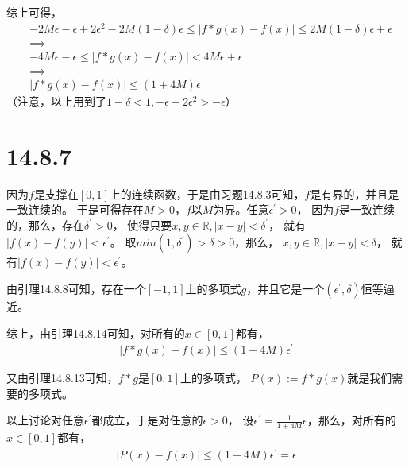 \documentclass{article}
\begin{document}
\begin{itemize}
        综上可得，
        \begin{align*}
           & -2M\epsilon - \epsilon + 2\epsilon^2 -2M(1-\delta)\epsilon \leq |f \ast g(x) - f(x)| \leq 2M(1-\delta)\epsilon + \epsilon \\
           & \implies                                                                                                                  \\
           & -4M\epsilon - \epsilon \leq |f \ast g(x) - f(x)| < 4M\epsilon + \epsilon                                                  \\
           & \implies                                                                                                                  \\
           & |f \ast g(x) - f(x)| \leq (1 + 4M)\epsilon
        \end{align*}
        （注意，以上用到了$1 - \delta < 1, - \epsilon + 2\epsilon^2 > -\epsilon$）

\end{itemize}

\section*{14.8.7}

因为$f$是支撑在$[0,1]$上的连续函数，于是由习题14.8.3可知，$f$是有界的，并且是一致连续的。
于是可得存在$M > 0$，$f$以$M$为界。任意$\epsilon^\prime > 0$，
因为$f$是一致连续的，那么，存在$\delta^\prime > 0$，
使得只要$x, y \in \mathbb{R}, |x - y| < \delta^\prime$，
就有$|f(x) - f(y)| < \epsilon^\prime$。
取$min(1, \delta^\prime) > \delta > 0$，那么，
$x, y \in \mathbb{R}, |x - y| < \delta$，
就有$|f(x) - f(y)| < \epsilon^\prime$。

由引理14.8.8可知，存在一个$[-1, 1]$上的多项式$g$，并且它是一个$(\epsilon^\prime, \delta)$恒等逼近。

综上，由引理14.8.14可知，对所有的$x \in [0, 1]$都有，
\begin{align*}
  |f \ast g(x) - f(x)| \leq (1 + 4M)\epsilon^\prime
\end{align*}

又由引理14.8.13可知，$f \ast g$是$[0, 1]$上的多项式，
$P(x) := f \ast g(x)$就是我们需要的多项式。

以上讨论对任意$\epsilon^\prime$都成立，于是对任意的$\epsilon > 0$，
设$\epsilon^\prime = \frac{1}{1+4M}\epsilon$，那么，对所有的$x \in [0, 1]$都有，
\begin{align*}
  |P(x) - f(x)| \leq (1 + 4M)\epsilon^\prime = \epsilon
\end{align*}
\end{document}
